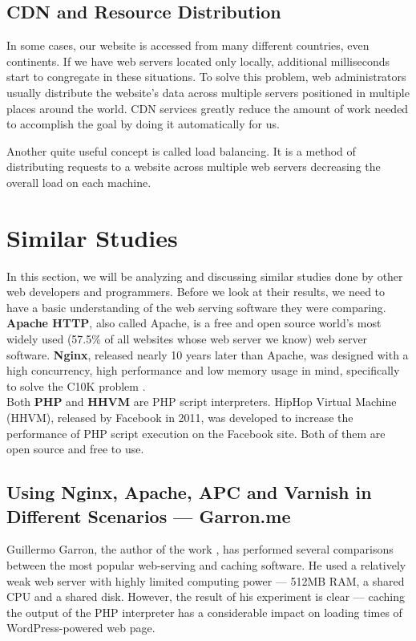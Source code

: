 \subsection{CDN and Resource Distribution}

In some cases, our website is accessed from many different countries, even continents. If we have web servers located only locally, additional milliseconds start to congregate in these situations. To solve this problem, web administrators usually distribute the website’s data across multiple servers positioned in multiple places around the world. CDN services greatly reduce the amount of work needed to accomplish the goal by doing it automatically for us.

Another quite useful concept is called load balancing. It is a method of distributing requests to a website across multiple web servers decreasing the overall load on each machine.

\section{Similar Studies}

In this section, we will be analyzing and discussing similar studies done by other web developers and programmers. Before we look at their results, we need to have a basic understanding of the web serving software they were comparing. \\

\textbf{Apache HTTP}, also called Apache, is a free and open source world's most widely used (57.5\%\cite{Apache:Usage} of all websites whose web server we know) web server software. \textbf{Nginx}, released nearly 10 years later than Apache, was designed with a high concurrency, high performance and low memory usage in mind, specifically to solve the C10K problem \cite{Nginx:c10k}. \\

Both \textbf{PHP} and \textbf{HHVM} are PHP script interpreters. HipHop Virtual Machine (HHVM), released by Facebook in 2011, was developed to increase the performance of PHP script execution on the Facebook site. Both of them are open source and free to use.

\subsection{Using Nginx, Apache, APC and Varnish in Different Scenarios — Garron.me}

Guillermo Garron, the author of the work \cite{Study:Perf-Garron}, has performed several comparisons between the most popular web-serving and caching software. He used a relatively weak web server with highly limited computing power — 512MB RAM, a shared CPU and a shared disk. However, the result of his experiment is clear — caching the output of the PHP interpreter has a considerable impact on loading times of WordPress-powered web page. \\

